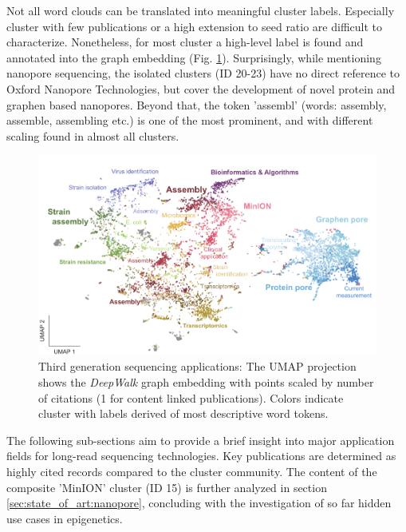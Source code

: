 Not all word clouds can be translated into meaningful cluster labels.
Especially cluster with few publications or a high extension to seed ratio are difficult to characterize.
Nonetheless, for most cluster a high-level label is found and annotated into the graph embedding (Fig. \ref{fig:state_of_art:umap_cluster}).
Surprisingly, while mentioning nanopore sequencing, the isolated clusters (ID 20-23) have no direct reference to Oxford Nanopore Technologies, but cover the development of novel protein and graphen based nanopores.
Beyond that, the token 'assembl' (words: assembly, assemble, assembling etc.) is one of the most prominent, and with different scaling found in almost all clusters.


\begin{figure}[h]
	\centering
	\includegraphics[width=1.0\textwidth]{figures/state_of_art/umap_cluster.pdf}
	\captionsetup{format=plain}
	\caption[Third generation sequencing applications]{Third generation sequencing applications: The UMAP projection shows the \textit{DeepWalk} graph embedding with points scaled by number of citations (1 for content linked publications). Colors indicate cluster with labels derived of most descriptive word tokens.}
	\label{fig:state_of_art:umap_cluster}
\end{figure}

The following sub-sections aim to provide a brief insight into major application fields for long-read sequencing technologies.
Key publications are determined as highly cited records compared to the cluster community.
The content of the composite 'MinION' cluster (ID 15) is further analyzed in section \ref{sec:state_of_art:nanopore}, concluding with the investigation of so far hidden use cases in epigenetics.




